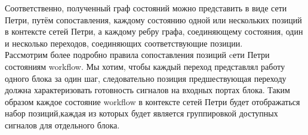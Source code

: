 \documentclass[a4paper,12pt]{article}
\begin{document}
 Соответственно, полученный граф состояний можно представить в виде сети Петри, путём сопоставления, каждому состоянию одной или нескольких позиций в контексте сетей Петри, а каждому ребру графа, соединяющему состояния, один и несколько переходов, соединяющих соответствующие позиции. \\

Рассмотрим более подробно правила сопоставления позиций cети Петри состояниям workflow. Мы хотим, чтобы каждый переход представлял работу одного блока за один шаг, следовательно позиция предшествующая переходу должна характеризовать готовность сигналов на  входных портах блока. Таким образом каждое состояние workflow в контексте сетей Петри будет отображаться набор позиций,каждая из которых будет является группировкой доступных сигналов для отдельного блока.
\end{document}
